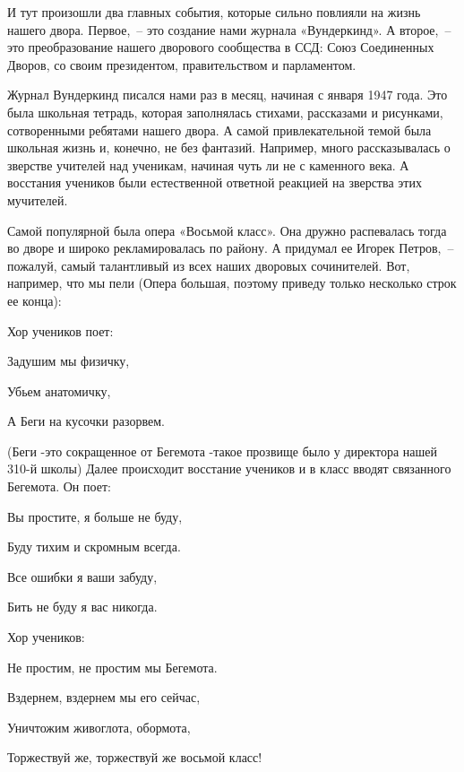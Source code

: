 И тут произошли два главных события, которые сильно повлияли на жизнь нашего двора. Первое,~-- это создание нами журнала «Вундеркинд». А второе,~-- это преобразование нашего дворового сообщества в ССД: Союз Соединенных Дворов, со своим президентом, правительством и парламентом.

Журнал Вундеркинд писался нами раз в месяц, начиная с января 1947 года. Это была школьная тетрадь, которая заполнялась стихами, рассказами и рисунками, сотворенными ребятами нашего двора. А самой привлекательной темой была школьная жизнь и, конечно, не без фантазий. Например, много рассказывалась о зверстве учителей над ученикам, начиная чуть ли не с каменного века. А восстания учеников были естественной ответной реакцией на зверства этих мучителей.

Самой популярной была опера «Восьмой класс». Она дружно распевалась тогда во дворе и широко рекламировалась по району. А придумал ее Игорек Петров,~-- пожалуй, самый талантливый из всех наших дворовых сочинителей. Вот, например, что мы пели (Опера большая, поэтому приведу только несколько строк ее конца): 

Хор учеников поет:

\indent

{\itshape

Задушим мы физичку,

Убьем анатомичку,

А Беги на кусочки разорвем.

}

\indent

(Беги -это сокращенное от Бегемота -такое прозвище было у директора нашей 310-й школы) Далее происходит восстание учеников и в класс вводят связанного Бегемота. Он поет:

\indent

{\itshape

Вы простите, я больше не буду, 

Буду тихим и скромным всегда. 

Все ошибки я ваши забуду, 

Бить не буду я вас никогда.

}

\indent

\noindent
Хор учеников:

\indent

{\itshape

Не простим, не простим мы Бегемота. 

Вздернем, вздернем мы его сейчас,
 
Уничтожим живоглота, обормота, 

Торжествуй же, торжествуй же восьмой класс!

}

